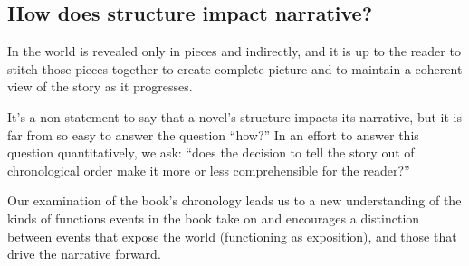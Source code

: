 \subsection{How does structure impact narrative?}

In \infinitejest the world is revealed only in pieces and indirectly, and it is up to the reader to stitch those pieces together to create complete picture and to maintain a coherent view of the story as it progresses. 

It's a non-statement to say that a novel's structure impacts its narrative, but it is far from so easy to answer the question ``how?'' In an effort to answer this question quantitatively, we ask: ``does the decision to tell the story out of chronological order make it more or less comprehensible for the reader?''

Our examination of the book's chronology leads us to a new understanding of the kinds of functions events in the book take on and encourages a distinction between events that expose the world (functioning as exposition), and those that drive the narrative forward.
